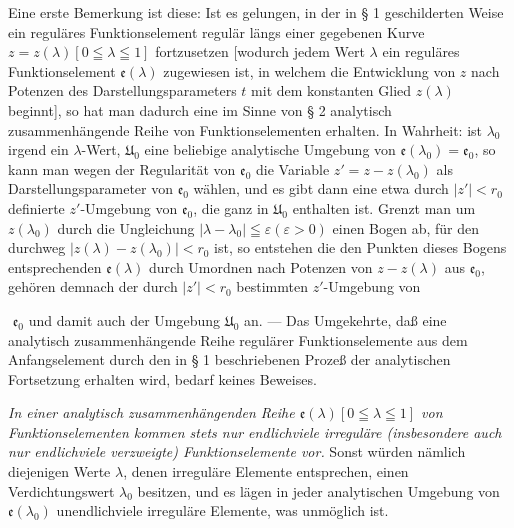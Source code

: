 \documentclass{article}
\begin{document}
Eine erste Bemerkung ist diese: Ist es gelungen, in der in § 1 geschilderten Weise ein reguläres Funktionselement regulär längs einer gegebenen Kurve $z = z(\lambda) [0 \leqq \lambda \leqq 1]$ fortzusetzen [wodurch jedem Wert $\lambda$ ein reguläres Funktionselement $\mathfrak{e}(\lambda)$ zugewiesen ist, in welchem die Entwicklung von $z$ nach Potenzen des Darstellungsparameters $t$ mit dem konstanten Glied $z(\lambda)$ beginnt], so hat man dadurch eine im Sinne von § 2 analytisch zusammenhängende Reihe von Funktionselementen erhalten. In Wahrheit: ist $\lambda_0$ irgend ein $\lambda$-Wert, $\mathfrak{U}_0$ eine beliebige analytische Umgebung von $\mathfrak{e}(\lambda_0) = \mathfrak{e}_0$, so kann man wegen der Regularität von $\mathfrak{e}_0$ die Variable $z' = z - z(\lambda_0)$ als Darstellungsparameter von $\mathfrak{e}_0$ wählen, und es gibt dann eine etwa durch $|z'| < r_0$ definierte $z'$-Umgebung von $\mathfrak{e}_0$, die ganz in $\mathfrak{U}_0$ enthalten ist. Grenzt man um $z(\lambda_0)$ durch die Ungleichung $|\lambda - \lambda_0| \leqq \varepsilon (\varepsilon > 0)$ einen Bogen ab, für den durchweg $|z(\lambda) - z(\lambda_0)| < r_0$ ist, so entstehen die den Punkten dieses Bogens entsprechenden $\mathfrak{e}(\lambda)$ durch Umordnen nach Potenzen von $z - z(\lambda)$ aus $\mathfrak{e}_0$, gehören demnach der durch $|z'| < r_0$ bestimmten $z'$-Umgebung von

﻿
$\mathfrak{e}_0$ und damit auch der Umgebung $\mathfrak{U}_0$ an. --- Das Umgekehrte, daß eine analytisch zusammenhängende Reihe regulärer Funktionselemente aus dem Anfangselement durch den in § 1 beschriebenen Prozeß der analytischen Fortsetzung erhalten wird, bedarf keines Beweises.

\emph{In einer analytisch zusammenhängenden Reihe $\mathfrak{e}(\lambda) [0 \leqq \lambda \leqq 1]$ von Funktionselementen kommen stets nur endlichviele irreguläre (insbesondere auch nur endlichviele verzweigte) Funktionselemente vor.} Sonst würden nämlich diejenigen Werte $\lambda$, denen irreguläre Elemente entsprechen, einen Verdichtungswert $\lambda_0$ besitzen, und es lägen in jeder analytischen Umgebung von $\mathfrak{e}(\lambda_0)$ unendlichviele irreguläre Elemente, was unmöglich ist.
\end{document}
